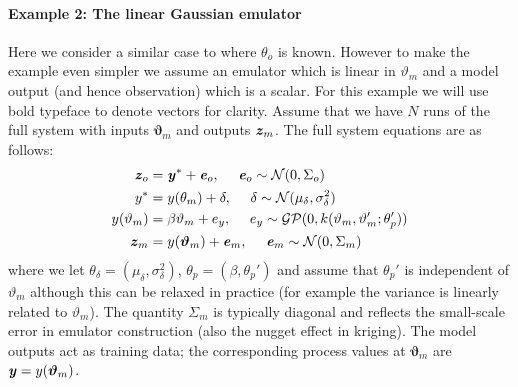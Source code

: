 \documentclass[10pt,a4paper]{article}
\newcommand{\varthetab} {{\boldsymbol{\vartheta}}}
\newcommand{\evec} {\textbf{\textit{e}}}
\newcommand{\yvec} {\textbf{\textit{y}}}
\newcommand{\zvec} {\textbf{\textit{z}}}
\begin{document}
\paragraph{Example 2: The linear Gaussian emulator} Here we consider a similar case to \cite{Higdon_2004} where $\theta_o$ is known. However to make the example even simpler we assume an emulator which is linear in $\vartheta_m$ and a model output (and hence observation) which is a scalar. For this example we will use bold typeface to denote vectors for clarity. Assume that we have $N$ runs of the full system with inputs $\varthetab_m$ and outputs $\zvec_m$. The full system equations are as follows:
\begin{align}
\zvec_o &= \yvec^* + \evec_o,~~~~ \evec_o \sim \mathcal{N}(0,\Sigma_o) \\
y^* &= y(\theta_m) + \delta,~~~~ \delta \sim \mathcal{N}(\mu_\delta,\sigma^2_\delta) \\
y(\vartheta_m) &= \beta\vartheta_m + e_y,~~~~ e_y \sim \mathcal{GP}(0,k(\vartheta_m,\vartheta_m';\theta_p')) \\
\zvec_m &= y(\varthetab_m) + \evec_m, ~~~~ \evec_m \sim \mathcal{N}(0,\Sigma_m)
\end{align}
\noindent where we let $\theta_\delta = (\mu_\delta,\sigma^2_\delta)$, $\theta_p = (\beta,\theta_p')$ and assume that $\theta_p'$ is independent of $\vartheta_m$ although this can be relaxed in practice (for example the variance is linearly related to $\vartheta_m$). The quantity $\Sigma_m$ is typically diagonal and reflects the small-scale error in emulator construction (also the nugget effect in kriging). The model outputs act as training data; the corresponding process values at $\varthetab_m$ are $\yvec = y(\varthetab_m)$. 
\end{document}
